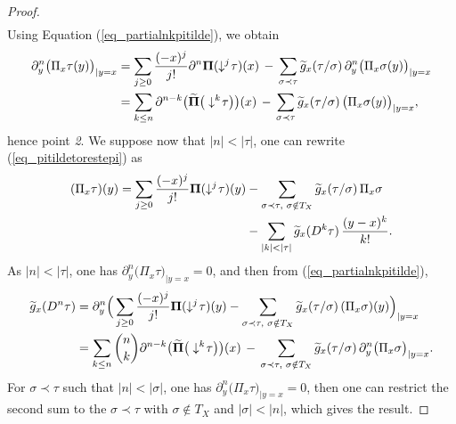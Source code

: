 \documentclass[11pt]{preprint}
\def\PPi{\boldsymbol{\Pi}}
\def\eqref#1{(\ref{#1})}
\begin{document}
\begin{proof}
\begin{equation}
\begin{split}
		\end{split}\end{equation}
		Using Equation \eqref{eq_partialnkpitilde}, we obtain
		\begin{align*}
			\partial^n_y\big(  { \Pi}_x\tau(y)   \big)_{|y=x} 
			&= 
			\sum_{j\geq 0}\frac{(-x)^j}{j!}  \partial^n{\PPi}(\downarrow^j\hspace{-2pt}\tau)(x) \,  - \,  \sum_{\sigma\prec\tau} \widetilde{ g}_x(\tau/\sigma) \, \partial^n_y\big({\Pi}_x\sigma(y)\big)_{|y=x}
			\\
			&=\sum_{k\leq n} \partial^{n-k} \big( \widetilde{ \PPi}\big(\downarrow^k\hspace{-2pt}\tau\big)\big)(x) \,  - \,  \sum_{\sigma\prec\tau} \widetilde{ g}_x(\tau/\sigma) \, \big({\Pi}_x\sigma(y)\big)_{|y=x},
		\end{align*}
		hence point \textit{2}. We suppose now that $|n|<|\tau|$, one can rewrite \eqref{eq_pitildetorestepi} as
		\begin{align*}
			({\Pi}_x\tau)(y) =\sum_{j\geq 0}\frac{(-x)^j}{j!}  {\PPi}(\downarrow^j\hspace{-2pt}\tau)(y)&-\sum_{\sigma\prec\tau, \,\, \sigma\notin T_X}  \widetilde{ g}_x(\tau/\sigma) \, {\Pi}_x\sigma 
			\\
			&- \sum_{|k|<|\tau|} \widetilde{ g}_x(D^k\tau) \,  \frac{(y-x)^k}{k!}.
		\end{align*}
		As $|n|<|\tau|$, one has $\partial_y^n\big({ \Pi}_x\tau\big)_{|y=x} = 0$, and then from \eqref{eq_partialnkpitilde},
		\begin{align*}
			\widetilde{ g }_x(D^n\tau) &= 
			\partial^n_{y} \Big(\sum_{j\geq 0}\frac{(-x)^j}{j!}  {\PPi}(\downarrow^j\hspace{-2pt}\tau)(y)-\sum_{\sigma\prec\tau, \,\, \sigma\notin T_X}  \widetilde{ g}_x(\tau/\sigma) \,  ({\Pi}_x\sigma)(y) \Big)_{|y=x}
			\\
			&=
			\sum_{k\leq n} \binom{n}{k}\partial^{n-k} \big( \widetilde{ \PPi}\big(\downarrow^k\hspace{-2pt}\tau\big)\big)(x) \, - \, \sum_{\sigma\prec\tau, \,\, \sigma\notin T_X}  \widetilde{ g}_x(\tau/\sigma) \, \partial^n_y\big({\Pi}_x\sigma\big)_{|y=x}.
		\end{align*}	
		For $\sigma\prec\tau$ such that $|n|<|\sigma|$, one has $\partial_y^n\big({ \Pi}_x\tau\big)_{|y=x} = 0$, then one can restrict the second sum to the $\sigma\prec\tau$ with $\sigma\notin T_X$ and $|\sigma|<|n|$, which gives the result.
	\end{proof}
	
\end{document}
